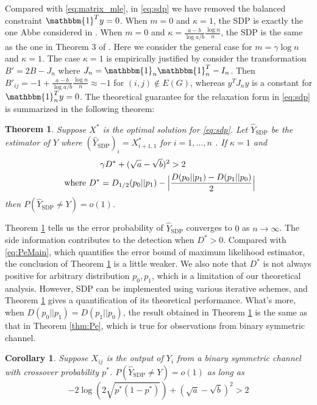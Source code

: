 \documentclass[conference]{IEEEtran}
\newtheorem{theorem}{Theorem}
\newtheorem{corollary}{Corollary}
\DeclareMathOperator{\SDP}{SDP}
\begin{document}
Compared with \eqref{eq:matrix_mle}, in \eqref{eq:sdp} we have removed
the balanced constraint $\mathbbm{1}^T y = 0$. When $m=0$ and $\kappa=1$,
the SDP is exactly the one Abbe considered in \cite{abbe2015exact}.
When $m=0$ and $\kappa=\frac{a-b}{\log a/b}\frac{\log n}{n}$, the SDP is
the same as the one in Theorem 3 of \cite{Hajek16}. Here we consider the
general case for $m=\gamma \log n$ and $\kappa = 1$. The case $\kappa=1$
is empirically justified by consider the transformation $B'=2B-J_n$ where
$J_n=\mathbbm{1}_n \mathbbm{1}_n^T- I_n$. Then $B'_{ij} = -1 +\frac{a-b}{\log a/b}\frac{\log n}{n} \approx -1$
for $(i,j)\not\in E(G)$, whereas $y^T J_n y$ is a constant for $\mathbbm{1}^T_n y = 0$.
The theoretical guarantee for the relaxation form in \eqref{eq:sdp} is summarized
in the following theorem:
\begin{theorem}\label{thm:sdp}
	Suppose $X^*$ is the optimal solution for \eqref{eq:sdp}.
	Let $\hat{Y}_{\SDP}$ be the estimator of $Y$ where  $(\hat{Y}_{\SDP})_i = X^*_{i+1, 1}$ for $i=1,\dots, n$ .
	If $\kappa = 1$
	and
	\begin{align}
	&\gamma D^* + (\sqrt{a} - \sqrt{b})^2 > 2  \\
	\textrm{ where } D^* &= D_{1/2}(p_0||p_1) - \Big\vert\frac{D(p_0||p_1) - D(p_1||p_0)}{2}\Big\vert\notag
	\end{align}
	then $P(\hat{Y}_{\SDP} \neq  Y) = o(1)$.
\end{theorem}
Theorem \ref{thm:sdp} tells us the error probability of $\hat{Y}_{\SDP}$ converges to $0$ as $n\to \infty$. The side information contributes to
the detection when $D^*>0$. Compared with \ref{eq:PeMain}, which quantifies the error bound of maximum likelihood estimator,
the conclusion of Theorem \ref{thm:sdp} is a little weaker. We also note that $D^*$ is not always positive for arbitrary distribution $p_0,p_1$, which is a limitation of our theoretical
analysis. However, SDP can be implemented using various iterative schemes, and Theorem \ref{thm:sdp} gives a quantification of its theoretical
performance. What's more, when
$D(p_0||p_1) = D(p_1||p_0)$, the result obtained in Theorem \ref{thm:sdp} is the same as
that in Theorem \ref{thm:Pe}, which is true for observations from binary symmetric channel.
\begin{corollary}
	Suppose $X_{ij}$ is the output of $Y_i$ from a binary symmetric channel with crossover probability
	$p^*$. $P(\hat{Y}_{\SDP} \neq  Y) = o(1)$ as long as
	\begin{equation}
	-2\log(2\sqrt{p^*(1-p^*)}) + (\sqrt{a} - \sqrt{b})^2>2
	\end{equation}
\end{corollary}
\end{document}
